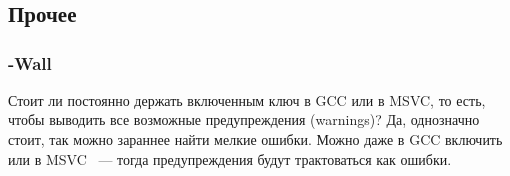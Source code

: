 ﻿\chapter{}




\section{Прочее}
\subsection{-Wall}

Стоит ли постоянно держать включенным ключ  в GCC или  в MSVC, то есть, чтобы выводить
все возможные предупреждения (warnings)?
Да, однозначно стоит, так можно зараннее найти мелкие ошибки.
Можно даже в GCC включить  или  в MSVC ~--- 
тогда предупреждения будут трактоваться как ошибки.

